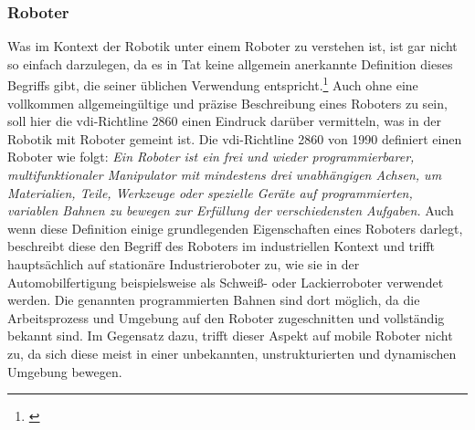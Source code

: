 \subsubsection{Roboter}
\color{finishing}
Was im Kontext der Robotik unter einem Roboter zu verstehen ist, ist gar nicht so einfach darzulegen, da es in Tat keine allgemein anerkannte Definition dieses Begriffs gibt, die seiner üblichen Verwendung entspricht.\footnote{\citep[vgl.][Mobile Roboter, Seite 2]{Hertzberg.MobileRoboter}\label{note2}}
\newline
Auch ohne eine vollkommen allgemeingültige und präzise Beschreibung eines Roboters zu sein, soll hier die \gls{vdi}-Richtline 2860 einen Eindruck darüber vermitteln, was in der Robotik mit Roboter gemeint ist. \newline
Die \gls{vdi}-Richtline 2860 von 1990 definiert einen Roboter wie folgt:
\vspace{2mm}
\newline
\glqq{}\textit{Ein Roboter ist ein frei und wieder programmierbarer, multifunktionaler Manipulator mit mindestens drei unabhängigen Achsen, um Materialien, Teile, Werkzeuge oder spezielle Geräte auf programmierten,
variablen Bahnen zu bewegen zur Erfüllung der verschiedensten Aufgaben.}\grqq{}
\vspace{2mm}
\newline
Auch wenn diese Definition einige grundlegenden Eigenschaften eines Roboters darlegt, beschreibt diese den Begriff des Roboters im industriellen Kontext und trifft hauptsächlich auf stationäre Industrieroboter zu, wie sie in der Automobilfertigung beispielsweise als Schweiß- oder Lackierroboter verwendet werden. Die genannten programmierten Bahnen sind dort möglich, da die Arbeitsprozess und Umgebung auf den Roboter zugeschnitten und vollständig bekannt sind. \newline
Im Gegensatz dazu, trifft dieser Aspekt auf mobile Roboter nicht zu, da sich diese meist in einer unbekannten, unstrukturierten und dynamischen Umgebung bewegen.
